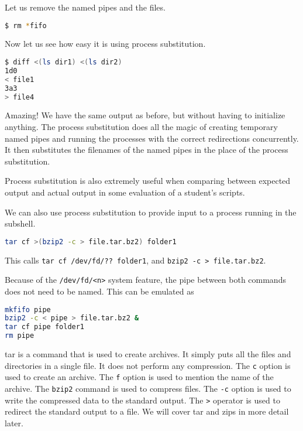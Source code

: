 Let us remove the named pipes and the files.
\begin{lstlisting}[language=bash]
$ rm *fifo
\end{lstlisting}

Now let us see how easy it is using process substitution.

\begin{lstlisting}[language=bash]
$ diff <(ls dir1) <(ls dir2)
1d0
< file1
3a3
> file4
\end{lstlisting}

Amazing! We have the same output as before, but without having
to initialize anything. The process substitution does all the
magic of creating temporary named pipes and running the processes
with the correct redirections concurrently. It then substitutes
the filenames of the named pipes in the place of the process
substitution.

Process substitution is also extremely useful when comparing
between expected output and actual output in some evaluation
of a student's scripts.

We can also use process substitution to provide input to a process
running in the subshell.

\begin{lstlisting}[language=bash]
tar cf >(bzip2 -c > file.tar.bz2) folder1
\end{lstlisting}

This calls \texttt{tar cf /dev/fd/?? folder1},
and \texttt{bzip2 -c > file.tar.bz2}.


Because of the \texttt{/dev/fd/<n>} system feature,
the pipe between both commands does not need to be named.
This can be emulated as

\begin{lstlisting}[language=bash]
mkfifo pipe
bzip2 -c < pipe > file.tar.bz2 &
tar cf pipe folder1
rm pipe
\end{lstlisting}

\begin{remark}
  tar is a command that is used to create archives.
  It simply puts all the files and directories in a single file.
  It does not perform any compression. The \texttt{c} option is
  used to create an archive. The \texttt{f} option is used to
  mention the name of the archive. The \texttt{bzip2} command
  is used to compress files. The \texttt{-c} option is used to
  write the compressed data to the standard output. The \texttt{>}
  operator is used to redirect the standard output to a file.
  We will cover tar and zips in more detail later.
\end{remark}

